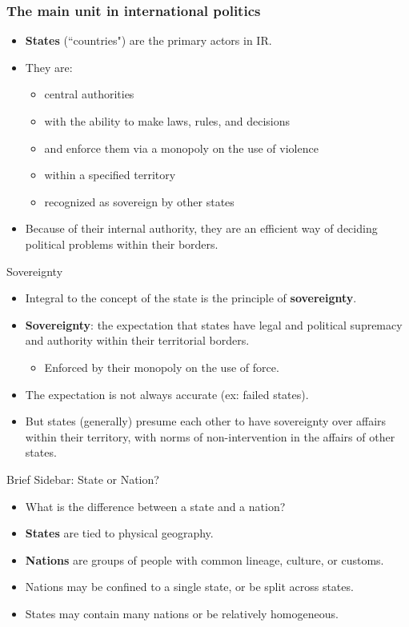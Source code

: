 \documentclass[handout]{beamer}
\begin{document}
\begin{frame} 
\frametitle{\LARGE{The main unit in international politics}}
\begin{itemize}
    \item \textbf{States} (``countries") are the primary actors in IR. \pause
    \item They are:
    \begin{itemize}
        \item central authorities \pause 
        \item with the ability to make laws, rules, and decisions \pause
        \item and enforce them via a monopoly on the use of violence \pause
        \item within a specified territory \pause
        \item recognized as sovereign by other states \pause
    \end{itemize}
    \item Because of their internal authority, they are an efficient way of deciding political problems within their borders.
\end{itemize}
\end{frame}

\begin{frame}{\LARGE Sovereignty}
\begin{itemize}
    \item Integral to the concept of the state is the principle of \textbf{sovereignty}. \pause
    \item \textbf{Sovereignty}: the expectation that states have legal and political supremacy and authority within their territorial borders.  \pause
    \begin{itemize}
    	\item Enforced by their monopoly on the use of force. \pause
    \end{itemize}
    \item The expectation is not always accurate (ex: failed states).  \pause
    \item But states (generally) presume each other to have sovereignty over affairs within their territory, with norms of non-intervention in the affairs of other states.
\end{itemize}
\end{frame}


\begin{frame}{\LARGE Brief Sidebar: State or Nation?}
\begin{itemize}
	\item What is the difference between a state and a nation? \pause
    \item \textbf{States} are tied to physical geography. \pause
    \item \textbf{Nations} are groups of people with common lineage, culture, or customs. \pause
    \item Nations may be confined to a single state, or be split across states. \pause
    \item States may contain many nations or be relatively homogeneous.
\end{itemize}
\end{frame}
\end{document}
